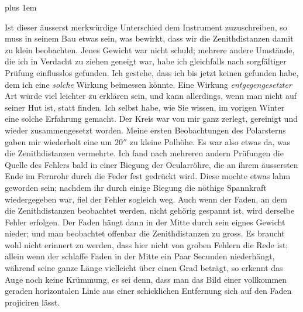 {\rightskip=0pt plus 1em \par\indent Ist dieser äusserst merkwürdige Unterschied dem Instrument zu\-zuschreiben, so muss in seinem Bau etwas sein, was bewirkt, dass wir die Zenithdistanzen damit zu klein beobachten. Jenes Gewicht war nicht schuld; mehrere andere Umstände, die ich in Verdacht zu ziehen geneigt war, habe ich gleichfalls nach sorgfältiger Prüfung einflusslos gefunden. Ich gestehe, dass ich bis jetzt keinen gefunden habe, dem ich eine \emph{solche} Wirkung beimessen könnte. Eine Wirkung \emph{entgegengesetzter} Art würde viel leichter zu erklären sein, und kann allerdings, wenn man nicht auf seiner Hut ist, statt finden. Ich selbst habe, wie Sie wissen, im vorigen Winter eine solche Erfahrung gemacht. Der Kreis war von mir ganz zerlegt, gereinigt und wieder zusammengesetzt worden. Meine ersten Beobachtungen des Polarsterns gaben mir wiederholt eine um $20''$ zu kleine Polhöhe. Es war also etwas da, was die Zenithdistanzen vermehrte. Ich fand nach mehreren andern Prüfungen die Quelle des Fehlers bald in einer Biegung der Ocularröhre, die an ihrem äussersten Ende im Fernrohr durch die Feder fest gedrückt  wird. Diese mochte etwas lahm geworden sein; nachdem ihr durch einige Biegung die nöthige Spannkraft wiedergegeben war, fiel der Fehler sogleich weg. Auch wenn der Faden, an dem die Zenithdistanzen beobachtet werden, nicht gehörig gespannt ist, wird derselbe Fehler erfolgen. Der Faden hängt dann in der Mitte durch sein eignes Gewicht nieder; und man beobachtet offenbar die Zenithdistanzen zu gross. Es braucht wohl nicht erinnert zu werden, dass hier nicht von groben Fehlern die Rede ist; allein wenn der schlaffe Faden in der Mitte ein Paar Secunden niederhängt, während seine ganze Länge vielleicht über einen Grad beträgt, so erkennt das Auge noch keine Krümmung, es sei denn, dass man das Bild einer vollkommen geraden horizontalen Linie aus einer schicklichen Entfernung sich auf den Faden projiciren lässt.\par}

